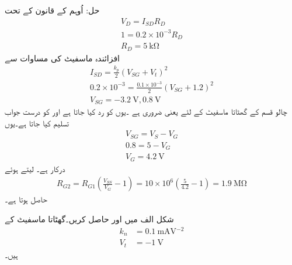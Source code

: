 حل:	اُوہم کے قانون کے تحت
\begin{align*}
V_D=I_{SD}R_D\\
1=0.2 \times 10^{-3} R_D\\
R_D=\SI{5}{\kilo \ohm}
\end{align*}
افزائندہ ماسفیٹ کی مساوات سے
\begin{align*}
I_{SD}=\frac{k_p}{2} \left(V_{SG}+V_t \right )^{2} \\
0.2 \times 10^{-3}=\frac{0.1 \times 10^{-3}}{2} \left(V_{SG}+1.2 \right )^{2}\\
V_{SG}=\SI{-3.2}{\volt}, \SI{0.8}{\volt}
\end{align*}
چالو   قسم کے گھٹاتا ماسفیٹ کے لئے  یعنی  ضروری ہے ۔یوں   کو رد کیا جاتا ہے اور    کو درست جواب تسلیم کیا جاتا ہے۔یوں
\begin{align*}
V_{SG}=V_S-V_G\\
0.8=5-V_G\\
V_G=\SI{4.2}{\volt}
\end{align*}
درکار ہے۔  لیتے ہوئے
\begin{align*}
R_{G2}=R_{G1} \left(\frac{V_{SS}}{V_G}-1 \right )=10 \times 10^{6} \left(\frac{5}{4.2}-1 \right)=\SI{1.9}{\mega \ohm}
\end{align*}
حاصل ہوتا ہے۔


شکل  الف میں  اور  حاصل کریں۔گھٹاتا ماسفیٹ کے
\begin{align*}
k_n&=\SI{0.1}{\milli \ampere \volt^{-2}}\\
V_t&=\SI{-1}{\volt}
\end{align*}
ہیں۔

